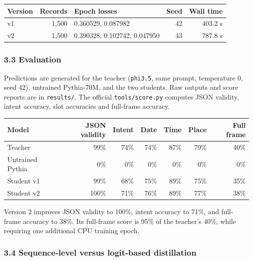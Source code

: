 \documentclass[
]{article}
\begin{document}
\begin{longtable}[]{@{}lrlrr@{}}
\toprule\noalign{}
Version & Records & Epoch losses & Seed & Wall time \\
\midrule\noalign{}
\endhead
\bottomrule\noalign{}
\endlastfoot
v1 & 1,500 & 0.360529, 0.087982 & 42 & 403.2 s \\
v2 & 1,500 & 0.390328, 0.102742, 0.047950 & 43 & 787.8 s \\
\end{longtable}

\hypertarget{evaluation}{%
\subsubsection{3.3 Evaluation}\label{evaluation}}

Predictions are generated for the teacher (\texttt{phi3.5}, same prompt,
temperature 0, seed 42), untrained Pythia-70M, and the two students. Raw
outputs and score reports are in \texttt{results/}. The official
\texttt{tools/score.py} computes JSON validity, intent accuracy, slot
accuracies and full-frame accuracy.

\begin{longtable}[]{@{}lrrrrrr@{}}
\toprule\noalign{}
Model & JSON validity & Intent & Date & Time & Place & Full frame \\
\midrule\noalign{}
\endhead
\bottomrule\noalign{}
\endlastfoot
Teacher & 99\% & 74\% & 74\% & 87\% & 79\% & 40\% \\
Untrained Pythia & 0\% & 0\% & 0\% & 0\% & 0\% & 0\% \\
Student v1 & 99\% & 68\% & 75\% & 89\% & 75\% & 35\% \\
Student v2 & 100\% & 71\% & 76\% & 89\% & 77\% & 38\% \\
\end{longtable}

Version 2 improves JSON validity to 100\%, intent accuracy to 71\%, and
full-frame accuracy to 38\%. Its full-frame score is 95\% of the
teacher's 40\%, while requiring one additional CPU training epoch.

\hypertarget{sequence-level-versus-logit-based-distillation}{%
\subsubsection{3.4 Sequence-level versus logit-based
distillation}\label{sequence-level-versus-logit-based-distillation}}
\end{document}
